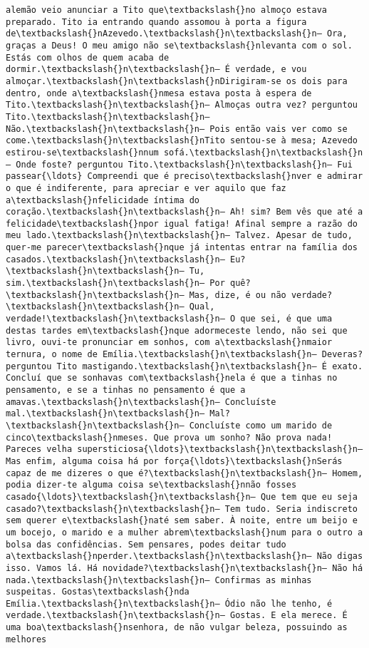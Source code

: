 \documentclass[11pt]{article}
\begin{document}
\begin{Verbatim}[commandchars=\\\{\}]
alemão veio anunciar a Tito que\textbackslash{}no almoço estava preparado. Tito ia entrando quando assomou à porta a figura de\textbackslash{}nAzevedo.\textbackslash{}n\textbackslash{}n— Ora, graças a Deus! O meu amigo não se\textbackslash{}nlevanta com o sol. Estás com olhos de quem acaba de dormir.\textbackslash{}n\textbackslash{}n— É verdade, e vou almoçar.\textbackslash{}n\textbackslash{}nDirigiram-se os dois para dentro, onde a\textbackslash{}nmesa estava posta à espera de Tito.\textbackslash{}n\textbackslash{}n— Almoças outra vez? perguntou Tito.\textbackslash{}n\textbackslash{}n— Não.\textbackslash{}n\textbackslash{}n— Pois então vais ver como se come.\textbackslash{}n\textbackslash{}nTito sentou-se à mesa; Azevedo estirou-se\textbackslash{}nnum sofá.\textbackslash{}n\textbackslash{}n— Onde foste? perguntou Tito.\textbackslash{}n\textbackslash{}n— Fui passear{\ldots} Compreendi que é preciso\textbackslash{}nver e admirar o que é indiferente, para apreciar e ver aquilo que faz a\textbackslash{}nfelicidade íntima do coração.\textbackslash{}n\textbackslash{}n— Ah! sim? Bem vês que até a felicidade\textbackslash{}npor igual fatiga! Afinal sempre a razão do meu lado.\textbackslash{}n\textbackslash{}n— Talvez. Apesar de tudo, quer-me parecer\textbackslash{}nque já intentas entrar na família dos casados.\textbackslash{}n\textbackslash{}n— Eu?\textbackslash{}n\textbackslash{}n— Tu, sim.\textbackslash{}n\textbackslash{}n— Por quê?\textbackslash{}n\textbackslash{}n— Mas, dize, é ou não verdade?\textbackslash{}n\textbackslash{}n— Qual, verdade!\textbackslash{}n\textbackslash{}n— O que sei, é que uma destas tardes em\textbackslash{}nque adormeceste lendo, não sei que livro, ouvi-te pronunciar em sonhos, com a\textbackslash{}nmaior ternura, o nome de Emília.\textbackslash{}n\textbackslash{}n— Deveras? perguntou Tito mastigando.\textbackslash{}n\textbackslash{}n— É exato. Concluí que se sonhavas com\textbackslash{}nela é que a tinhas no pensamento, e se a tinhas no pensamento é que a amavas.\textbackslash{}n\textbackslash{}n— Concluíste mal.\textbackslash{}n\textbackslash{}n— Mal?\textbackslash{}n\textbackslash{}n— Concluíste como um marido de cinco\textbackslash{}nmeses. Que prova um sonho? Não prova nada! Pareces velha supersticiosa{\ldots}\textbackslash{}n\textbackslash{}n— Mas enfim, alguma coisa há por força{\ldots}\textbackslash{}nSerás capaz de me dizeres o que é?\textbackslash{}n\textbackslash{}n— Homem, podia dizer-te alguma coisa se\textbackslash{}nnão fosses casado{\ldots}\textbackslash{}n\textbackslash{}n— Que tem que eu seja casado?\textbackslash{}n\textbackslash{}n— Tem tudo. Seria indiscreto sem querer e\textbackslash{}naté sem saber. À noite, entre um beijo e um bocejo, o marido e a mulher abrem\textbackslash{}num para o outro a bolsa das confidências. Sem pensares, podes deitar tudo a\textbackslash{}nperder.\textbackslash{}n\textbackslash{}n— Não digas isso. Vamos lá. Há novidade?\textbackslash{}n\textbackslash{}n— Não há nada.\textbackslash{}n\textbackslash{}n— Confirmas as minhas suspeitas. Gostas\textbackslash{}nda Emília.\textbackslash{}n\textbackslash{}n— Ódio não lhe tenho, é verdade.\textbackslash{}n\textbackslash{}n— Gostas. E ela merece. É uma boa\textbackslash{}nsenhora, de não vulgar beleza, possuindo as melhores 
\end{Verbatim}
\end{document}
